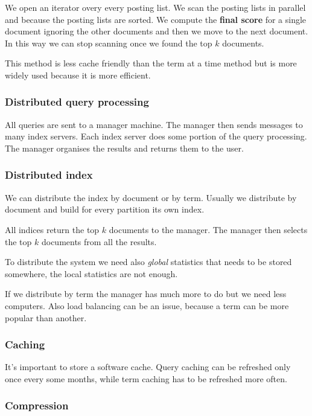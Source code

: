 We open an iterator overy every posting list. We scan the posting lists
in parallel and because the posting lists are sorted. We compute the 
\textbf{final score} for a single document ignoring the other documents
and then we move to the next document.
In this way we can stop scanning once we found the top $k$ documents.

This method is less cache friendly than the term at a time method but
is more widely used because it is more efficient.

\subsubsection{Distributed query processing}
\label{sec:distributed_query_processing}

All queries are sent to a manager machine.
The manager then sends messages to many index servers.
Each index server does some portion of the query processing.
The manager organises the results and returns them to the user.

\subsubsection{Distributed index}
\label{sec:distributed_index}

We can distribute the index by document or by term.
Usually we distribute by document and build for every partition
its own index.

All indices return the top $k$ documents to the manager.
The manager then selects the top $k$ documents from all the results.

To distribute the system we need also \textit{global} statistics that needs to be
stored somewhere, the local statistics are not enough.

If we distribute by term the manager has much more to do but we need less computers.
Also load balancing can be an issue, because a term can be more popular than another.

\subsubsection{Caching}
\label{sec:caching}

It's important to store a software cache. Query caching can be refreshed
only once every some months, while term caching has to be refreshed
more often.

\subsubsection{Compression}
\label{sec:compression}

